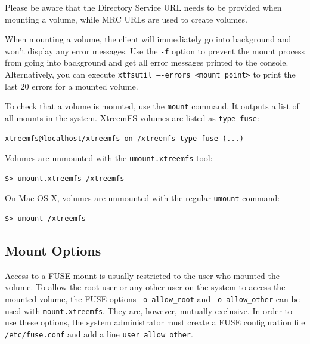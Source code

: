 \documentclass[a4paper,10pt]{book}
\begin{document}
Please be aware that the Directory Service URL needs to be provided when mounting a volume, while MRC URLs are used to create volumes.

When mounting a volume, the client will immediately go into background and won't display any error messages. Use the \texttt{-f} option to prevent the mount process from going into background and get all error messages printed to the console. Alternatively, you can execute \texttt{xtfsutil ----errors <mount point>} to print the last 20 errors for a mounted volume.

To check that a volume is mounted, use the \texttt{mount} command. It outputs a list of all mounts in the system. XtreemFS volumes are listed as \texttt{type fuse}:

\begin{verbatim}
xtreemfs@localhost/xtreemfs on /xtreemfs type fuse (...)
\end{verbatim}

Volumes are unmounted with the \texttt{umount.xtreemfs} tool:

\begin{verbatim}
$> umount.xtreemfs /xtreemfs
\end{verbatim}

On Mac OS X, volumes are unmounted with the regular \texttt{umount} command:
\begin{verbatim}
$> umount /xtreemfs
\end{verbatim}

\subsection{Mount Options}

Access to a FUSE mount is usually restricted to the user who mounted the volume. To allow the root user or any other user on the system to access the mounted volume, the FUSE options \texttt{-o allow\_root} and \texttt{-o allow\_other} can be used with \texttt{mount.xtreemfs}. They are, however, mutually exclusive. In order to use these options, the system administrator must create a FUSE configuration file \texttt{/etc/fuse.conf} and add a line \texttt{user\_allow\_other}.
\end{document}
